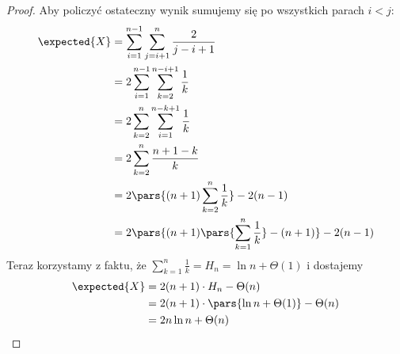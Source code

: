 \begin{proof}
Aby policzyć ostateczny wynik sumujemy się po wszystkich parach \( i < j \):
\begin{align*}
    \expected{X} 
        &= \sum_{i=1}^{n-1} \sum_{j=i+1}^{n} \frac{2}{j - i + 1} \\
        &= 2\sum_{i=1}^{n-1} \sum_{k=2}^{n-i+1} \frac{1}{k} \\
        &= 2\sum_{k=2}^n \sum_{i=1}^{n-k+1} \frac{1}{k} \\
        &= 2\sum_{k=2}^n \frac{n+1-k}{k} \\
        &= 2\pars{(n+1)\sum_{k=2}^n \frac{1}{k}} - 2(n-1) \\
        &= 2\pars{(n+1)\pars{\sum_{k=1}^n \frac{1}{k}} - (n+1)} - 2(n-1)
\end{align*}
Teraz korzystamy z faktu, że \( \sum_{k=1}^n \frac{1}{k} = H_n = \ln n + \Theta(1) \) i dostajemy
\begin{align*}
    \expected{X}
        &= 2(n+1)\cdot H_n - \Theta(n) \\
        &= 2(n+1)\cdot\pars{\ln n + \Theta(1)} - \Theta(n) \\
        &= 2n \ln n + \Theta(n)
\end{align*}
\end{proof}